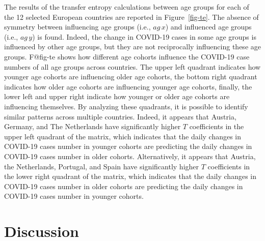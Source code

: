 \documentclass[
  number]{elsarticle}
\begin{document}
The results of the transfer entropy calculations between age groups for
each of the 12 selected European countries are reported in
Figure~\ref{fig-te}. The absence of symmetry between influencing age
groups (i.e., \(ag\,x\)) and influenced age groups (i.e., \(ag\,y\)) is
found. Indeed, the change in COVID-19 cases in some age groups is
influenced by other age groups, but they are not reciprocally
influencing these age groups. F@fig-te shows how different age cohorts
influence the COVID-19 case numbers of all age groups across countries.
The upper left quadrant indicates how younger age cohorts are
influencing older age cohorts, the bottom right quadrant indicates how
older age cohorts are influencing younger age cohorts, finally, the
lower left and upper right indicate how younger or older age cohorts are
influencing themselves. By analyzing these quadrants, it is possible to
identify similar patterns across multiple countries. Indeed, it appears
that Austria, Germany, and The Netherlands have significantly higher
\(T\) coefficients in the upper left quadrant of the matrix, which
indicates that the daily changes in COVID-19 cases number in younger
cohorts are predicting the daily changes in COVID-19 cases number in
older cohorts. Alternatively, it appears that Austria, the Netherlands,
Portugal, and Spain have significantly higher \(T\) coefficients in the
lower right quadrant of the matrix, which indicates that the daily
changes in COVID-19 cases number in older cohorts are predicting the
daily changes in COVID-19 cases number in younger cohorts.

\section{Discussion}\label{discussion}
\end{document}
